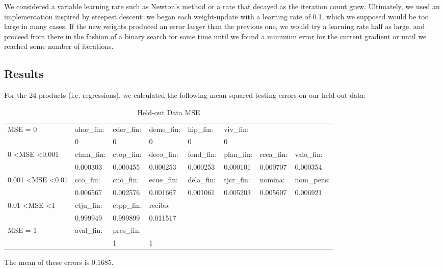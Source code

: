 \documentclass{article}
\begin{document}
\begin{spacing}{1}
\begin{large}
We considered a variable learning rate such as Newton's method or a rate that decayed as the iteration count grew. Ultimately, we used an implementation inspired by steepest descent: we began each weight-update with a learning rate of 0.1, which we supposed would be too large in many cases. If the new weights produced an error larger than the previous one, we would try a learning rate half as large, and proceed from there in the fashion of a binary search for some time until we found a minimum error for the current gradient or until we reached some number of iterations.

\subsection{Results}

For the 24 products (i.e. regressions), we calculated the following mean-squared testing errors on our held-out data:

\begin{table}[h]\footnotesize
	\centering
	\caption{Held-out Data MSE}
	\label{my-label}
	\begin{tabular}{llllllll}
		\hline
		MSE = 0                            & ahor\_fin:  & cder\_fin: & deme\_fin: & hip\_fin:  & viv\_fin:  &                     &            \\
		& 0                    & 0          & 0          & 0          & 0          &                     &            \\ \hline
		0 \textless MSE \textless 0.001      & ctma\_fin:          & ctop\_fin: & deco\_fin: & fond\_fin: & plan\_fin: & reca\_fin:  & valo\_fin: \\
		& 0.000303            & 0.000455   & 0.000253   & 0.000253   & 0.000101   &  0.000707             & 0.000354   \\ \hline
		0.001 \textless MSE \textless 0.01 & cco\_fin:           & cno\_fin:  & ecue\_fin: & dela\_fin: & tjcr\_fin: & nomina:             & nom\_pens: \\
		& 0.006567            & 0.002576   & 0.001667   & 0.001061   & 0.005203   & 0.005607            & 0.006921   \\ \hline
		0.01 \textless MSE \textless 1     & ctju\_fin:          & ctpp\_fin: & recibo:    &            &            &                     &            \\
		& 0.999949            & 0.999899   & 0.011517   &            &            &                     &            \\ \hline
		MSE = 1                            & aval\_fin:          & pres\_fin: &            &            &            &                     &\\
		&                    & 1          &1           &            &            &                     & \\
		\hline
	\end{tabular}
\end{table}
The mean of these errors is 0.1685.


\end{large}
\end{spacing}
\end{document}
